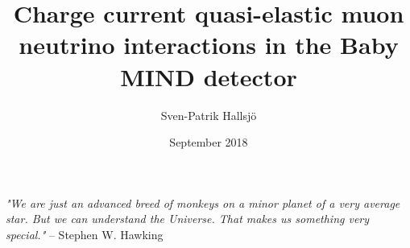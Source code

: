 \documentclass[oneside,hidelinks]{glasgowthesis}
\begin{document}
\pagestyle{empty}

\title{Charge current quasi-elastic muon neutrino interactions in the Baby MIND detector}
\author{Sven-Patrik Hallsj{\"o}}
\date{September 2018}

\maketitle

\cleardoublepage

 

\cleardoublepage
\vspace*{0.75in}

\textit{"We are just an advanced breed of monkeys on a minor planet of a very average star. But we can understand the Universe. That makes us something very special."} -- Stephen W. Hawking%



\newpage
 

\newpage
 







\end{document}

